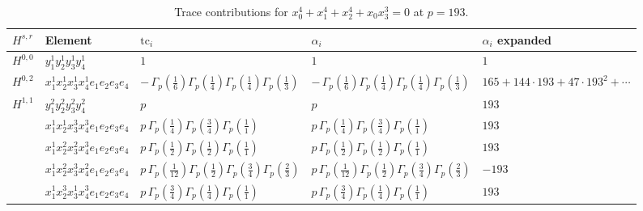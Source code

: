 \documentclass[11pt]{article}
\begin{document}
\begin{table}[ht]
\centering
\caption{Trace contributions for $x_0^{4} + x_1^{4} + x_2^{4} + x_0 x_3^{3} = 0$ at $p=193$.}\label{tab:deformed-1}
\renewcommand{\arraystretch}{1.1}
{\scriptsize
\begin{tabular}{@{}lllll@{}}
\toprule
$H^{s,r}$ & Element & $\mathrm{tc}_i$ & $\alpha_i$ & $\alpha_i$ expanded \\
\midrule
$H^{0,0}$ & $y_{1}^{1} y_{2}^{1} y_{3}^{1} y_{4}^{1}$ & $1$ & $1$ & $1$ \\
\midrule
$H^{0,2}$ & $x_{1}^{1} x_{2}^{1} x_{3}^{1} x_{4}^{1}  e_{1} e_{2} e_{3} e_{4}$ & $- \, \Gamma_p \left( \frac{1}{6} \right) \Gamma_p \left( \frac{1}{4} \right) \Gamma_p \left( \frac{1}{4} \right) \Gamma_p \left( \frac{1}{3} \right)$ & $- \, \Gamma_p \left( \frac{1}{6} \right) \Gamma_p \left( \frac{1}{4} \right) \Gamma_p \left( \frac{1}{4} \right) \Gamma_p \left( \frac{1}{3} \right)$ & $165{+}144{\cdot}193{+}47{\cdot}193^{2}{+}\cdots$ \\
\midrule
$H^{1,1}$ & $y_{1}^{2} y_{2}^{2} y_{3}^{2} y_{4}^{2}$ & $p \,$ & $p \,$ & $193$ \\
 & $x_{1}^{1} x_{2}^{1} x_{3}^{3} x_{4}^{3}  e_{1} e_{2} e_{3} e_{4}$ & $p \, \Gamma_p \left( \frac{1}{4} \right) \Gamma_p \left( \frac{3}{4} \right) \Gamma_p \left( \frac{1}{1} \right)$ & $p \, \Gamma_p \left( \frac{1}{4} \right) \Gamma_p \left( \frac{3}{4} \right) \Gamma_p \left( \frac{1}{1} \right)$ & $193$ \\
 & $x_{1}^{1} x_{2}^{2} x_{3}^{2} x_{4}^{3}  e_{1} e_{2} e_{3} e_{4}$ & $p \, \Gamma_p \left( \frac{1}{2} \right) \Gamma_p \left( \frac{1}{2} \right) \Gamma_p \left( \frac{1}{1} \right)$ & $p \, \Gamma_p \left( \frac{1}{2} \right) \Gamma_p \left( \frac{1}{2} \right) \Gamma_p \left( \frac{1}{1} \right)$ & $193$ \\
 & $x_{1}^{1} x_{2}^{2} x_{3}^{3} x_{4}^{2}  e_{1} e_{2} e_{3} e_{4}$ & $p \, \Gamma_p \left( \frac{1}{12} \right) \Gamma_p \left( \frac{1}{2} \right) \Gamma_p \left( \frac{3}{4} \right) \Gamma_p \left( \frac{2}{3} \right)$ & $p \, \Gamma_p \left( \frac{1}{12} \right) \Gamma_p \left( \frac{1}{2} \right) \Gamma_p \left( \frac{3}{4} \right) \Gamma_p \left( \frac{2}{3} \right)$ & $-193$ \\
 & $x_{1}^{1} x_{2}^{3} x_{3}^{1} x_{4}^{3}  e_{1} e_{2} e_{3} e_{4}$ & $p \, \Gamma_p \left( \frac{3}{4} \right) \Gamma_p \left( \frac{1}{4} \right) \Gamma_p \left( \frac{1}{1} \right)$ & $p \, \Gamma_p \left( \frac{3}{4} \right) \Gamma_p \left( \frac{1}{4} \right) \Gamma_p \left( \frac{1}{1} \right)$ & $193$ \\

\end{tabular}}
\end{table}
\end{document}
